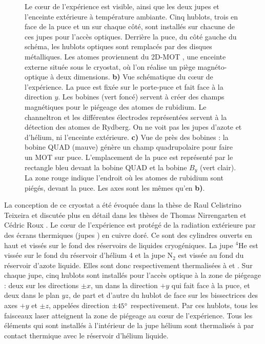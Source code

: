 \begin{figure}
{Le c\oe ur de l'expérience est visible, ainsi que les deux \og jupes \fg{} et l'enceinte extérieure à température ambiante.
Cinq hublots, trois en face de la puce et un sur chaque côté, sont installés sur chacune de ces jupes pour l'accès optiques.
Derrière la puce, du côté gauche du schéma, les hublots optiques sont remplacés par des disques métalliques.
Les atomes proviennent du \og 2D-MOT \fg{}, une enceinte externe située sous le cryostat, où l'on réalise un piège magnéto-optique à deux dimensions.
\textbf{b)} Vue schématique du c\oe ur de l'expérience. La puce est fixée sur le porte-puce et fait face à la direction $y$. Les bobines (vert foncé) servent à créer des champs magnétiques pour le piégeage des atomes de rubidium.
Le channeltron et les différentes électrodes représentées servent à la détection des atomes de Rydberg. On ne voit pas les \og jupes \fg{} d'azote et d'hélium, ni l'enceinte extérieure.
\textbf{c)} Vue de près des bobines : la bobine QUAD (mauve) génère un champ quadrupolaire pour faire un MOT sur puce. L'emplacement de la puce est représenté par le rectangle bleu devant la bobine QUAD et la bobine $B_y$ (vert clair).
La zone rouge indique l'endroit où les atomes de rubidium sont piégés, devant la puce.
Les axes sont les mêmes qu'en \textbf{b)}.
}
\label{fig:cryo}
\end{figure}
%
La conception de ce cryostat a été évoquée dans la thèse de Raul Celistrino Teixeira \cite{PHD_CELISTRINO}  et discutée plus en détail dans les thèses de Thomas Nirrengarten \cite{PHD_NIRRENGARTEN} et Cédric Roux \cite{PHD_ROUX}.
Le c\oe ur de l'expérience est protégé de la radiation extérieure par des écrans thermiques (\og jupes \fg{}) en cuivre doré. Ce sont des cylindres ouverts en haut et vissés sur le fond des réservoirs de liquides cryogéniques.
La jupe $^4 \text{He}$ est vissée sur le fond du réservoir d'hélium 4 et la jupe $\text{N}_2$ est vissée au fond du réservoir d'azote liquide.
Elles sont donc respectivement thermalisées à  et .
Sur chaque jupe, cinq hublots sont installés pour l'accès optique à la zone de piégeage :
deux sur les directions $\pm x$, un dans la direction $+y$ qui fait face à la puce, et deux  dans le plan $yz$, de part et d'autre du hublot de face sur les bissectrices des axes $+y$ et $\pm z$, appelées direction $\pm\SIvv{45}{\degree}$ respectivement.
Par ces hublots, tous les faisceaux laser atteignent la zone de piégeage au c\oe ur de l'expérience.
Tous les éléments qui sont installés à l'intérieur de la jupe hélium sont thermalisés à  par contact thermique avec le réservoir d'hélium liquide.

